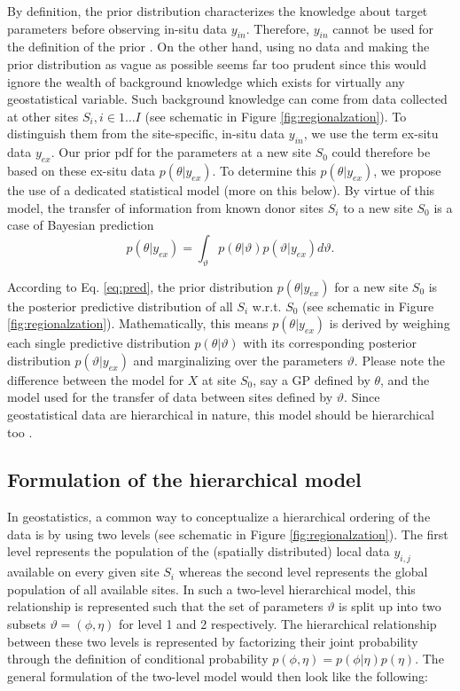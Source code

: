 By definition, the prior distribution characterizes the knowledge about target parameters before observing in-situ data $y_{in}$. 
Therefore, $y_{in}$ cannot be used for the definition of the prior \citep{James2006}. 
On the other hand, using no data and making the prior distribution as vague as possible seems far too prudent since this would ignore the wealth of background knowledge which exists for virtually any geostatistical variable. 
Such background knowledge can come from data collected at other sites $S_i, i \in 1 \dots I$ (see schematic in Figure \ref{fig:regionalzation}). 
To distinguish them from the site-specific, in-situ data $y_{in}$, we use the term ex-situ data $y_{ex}$. 
Our prior pdf for the parameters at a new site $S_0$ could therefore be based on these ex-situ data $p(\theta|y_{ex})$. 
To determine this $p(\theta|y_{ex})$, we propose the use of a dedicated statistical model (more on this below). 
By virtue of this model, the transfer of information from known donor sites $S_i$ to a new site $S_0$ is a case of Bayesian prediction 
\begin{equation}
    \label{eq:pred}
    p(\theta|y_{ex}) = \int_{\vartheta} p(\theta|\vartheta) p(\vartheta|y_{ex}) d\vartheta.
\end{equation}

According to Eq. \ref{eq:pred}, the prior distribution  $p(\theta|y_{ex})$ for a new site $S_0$  is the posterior predictive distribution of all $S_i$ w.r.t. $S_0$ (see schematic in Figure \ref{fig:regionalzation}). 
Mathematically, this means $p(\theta|y_{ex})$ is derived by weighing each single predictive distribution $p(\theta|\vartheta)$ with its corresponding posterior distribution $p(\vartheta|y_{ex}) $ and marginalizing over the parameters $\vartheta$.
Please note the difference between the model for $X$ at site $S_0$, say a GP defined by $\theta$, and the model used for the transfer of data between sites defined by ${\vartheta}$. 
Since geostatistical data are hierarchical in nature, this model should be hierarchical too \citep{Kruschke2010, Gelfand2012, Gelman2013}. 


\subsection{Formulation of the hierarchical model}\label{ssec:formulation}

In geostatistics, a common way to conceptualize a hierarchical ordering of the data is by using two levels (see schematic in Figure \ref{fig:regionalzation}). 
The first level represents the population of the (spatially distributed) local data $y_{i,j}$ available on every given site $S_i$ whereas the second level represents the global population of all available sites. 
In such a two-level hierarchical model, this relationship is represented such that the set of parameters $\vartheta$ is split up into two subsets $\vartheta = (\phi, \eta)$ for level 1 and 2 respectively. 
The hierarchical relationship between these two levels is represented by factorizing their joint probability through the definition of conditional probability $p(\phi, \eta) = p(\phi|\eta) p(\eta)$. 
The general formulation of the two-level model would then look like the following:

